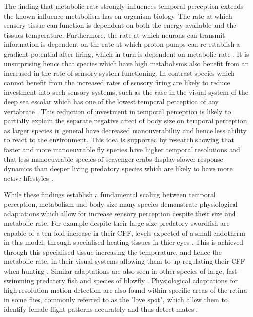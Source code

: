 The finding that metabolic rate strongly influences temporal perception extends the known influence metabolism has on organism biology. The rate at which sensory tissue can function is dependent on both the energy available and the tissues temperature. Furthermore, the rate at which neurons can transmit information is dependent on the rate at which proton pumps can re-establish a gradient potential after firing, which in turn is dependent on metabolic rate \citep{laughlin2001energy}. It is unsurprising hence that species which have high metabolisms also benefit from an increased in the rate of sensory system functioning. In contrast species which cannot benefit from the increased rates of sensory firing are likely to reduce investment into such sensory systems, such as the case in the visual system of the deep sea escolar which has one of the lowest temporal perception of any vertabrate \citep{landgren2014visual}. This reduction of investment in temporal perception is likely to partially explain the separate negative affect of body size on temporal perception as larger species in general have decreased manouverability \citep{heglund1988speed,dudley2002mechanisms,biewener2003animal,sato2007stroke,vogel2008modes,hedrick2011damping,watanabe2012slowest} and hence less ability to react to the environment. This idea is supported by research showing that faster and more manoeuvrable fly species have higher temporal resolutions \citep{laughlin1993fast} and that less manoeuvrable species of scavenger crabs display slower response dynamics than deeper living predatory species which are likely to have more active lifestyles \citep{frank2012light}. 


While these findings establish a fundamental scaling between temporal perception, metabolism and body size many species demonstrate physiological adaptations which allow for increase sensory perception despite their size and metabolic rate. For example despite their large size predatory swordfish are capable of a ten-fold increase in their CFF, levels expected of a small endotherm in this model, through specialised heating tissues in thier eyes \citep{fritsches2005warm}. This is achieved through this specialised tissue increasing the temperature, and hence the metabolic rate, in their visual systems allowing them to up-regulating their CFF when hunting \citep{fritsches2005warm}. Similar adaptations are also seen in other species of large, fast-swimming predatory fish \citep{carey1982brain,block1985warm,Wegner15052015} and species of blowfly \citep{tatler2000temperature}. Physiological adaptations for high-resolution motion detection are also found within specific areas of the retina in some flies, commonly referred to as the "love spot", which allow them to identify female flight patterns accurately and thus detect mates \citep{land1974chasing}. 

